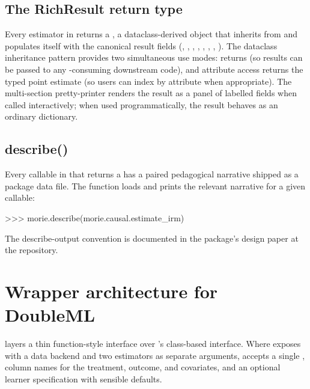 \documentclass[article,shortnames,nojss]{jss}
\begin{document}
\subsection{The RichResult return type}

Every estimator in  returns a , a
dataclass-derived object that inherits from  and
populates itself with the canonical result fields
(, , , ,
, , , ).
The dataclass inheritance pattern provides two simultaneous use
modes:  returns  (so
results can be passed to any -consuming downstream
code), and  attribute access returns the
typed point estimate (so users can index by attribute when
appropriate). The multi-section pretty-printer renders the result
as a panel of labelled fields when called interactively; when
used programmatically, the result behaves as an ordinary
dictionary.

\subsection{describe()}

Every callable in  that returns a 
has a paired  pedagogical narrative
shipped as a package data file. The 
function loads and prints the relevant narrative for a given
callable:

\begin{Code}
>>> morie.describe(morie.causal.estimate_irm)
\end{Code}

\noindent The describe-output convention is documented in the
package's design paper at the repository.

\section{Wrapper architecture for DoubleML}
\label{sec:wrapper}

 layers a thin function-style interface over
's class-based interface. Where 
exposes  with a data
backend and two  estimators as separate
arguments,  accepts a single
 , column names for the treatment,
outcome, and covariates, and an optional learner specification
with sensible defaults.
\end{document}
